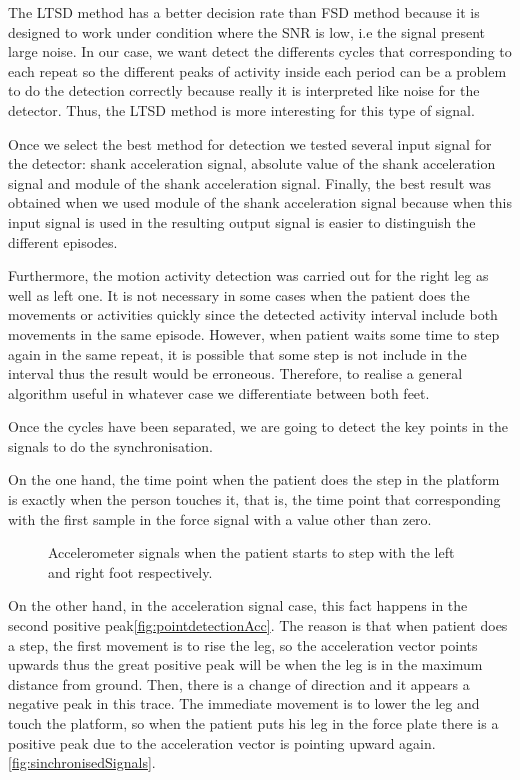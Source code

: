 The LTSD method has a better decision rate than FSD method because it is designed to work under condition where the SNR is low, i.e the signal present large noise\cite{A.Olivares2013}. In our case, we want detect the differents cycles that corresponding to each repeat so the different peaks of activity inside each period can be a problem to do the detection correctly because really it is interpreted like noise for the detector. Thus, the LTSD method is more interesting for this type of signal.

Once we select the best method for detection we tested several input signal for the detector: shank acceleration signal, absolute value of the shank acceleration signal and module of the shank acceleration signal. Finally, the best result was obtained when we used module of the shank acceleration signal because when this input signal is used in the resulting output signal is easier to distinguish the different episodes.

Furthermore, the motion activity detection was carried out for the right leg as well as left one. It is not necessary in some cases when the patient does the movements or activities quickly since the detected activity interval  include both movements in the same episode. However, when patient waits some time to step again in the same repeat, it is possible that some step is not  include in the interval thus the result would be erroneous. Therefore, to realise a general algorithm useful in whatever case we differentiate between both feet.

Once the cycles have been separated, we are going to detect the key points in the signals to do the synchronisation. 

On the one hand, the time point when the patient does the step in the platform is exactly when the person touches it, that is, the time point that corresponding with the first sample in the force signal with a value other than zero.

\begin{figure}[H]
	\centering
	\caption{Accelerometer signals when the patient starts to step with the left and right foot respectively.}
	\label{fig:startLeftRight}
\end{figure} 

On the other hand, in the acceleration signal case, this fact happens in the second positive peak\ref{fig:pointdetectionAcc}. The reason is that when patient does a step, the first movement is to rise the leg, so the acceleration vector points upwards thus the great positive peak will be when the leg is in the maximum distance from ground. Then, there is a change of direction and it appears a negative peak in this trace. The immediate movement is to lower the leg and touch the platform, so when the patient puts his leg in the force plate there is a positive peak due to the acceleration vector is pointing upward again.\ref{fig:sinchronisedSignals}.

